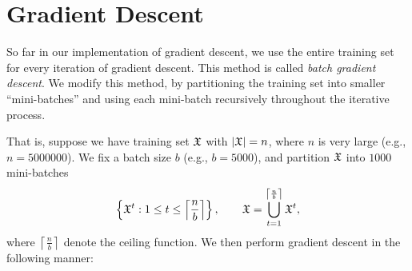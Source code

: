 


\section{Gradient Descent}

So far in our implementation of gradient descent, we use the entire training set for every iteration of gradient descent.  This method is called \textit{batch gradient descent}.  We modify this method, by partitioning the training set into smaller ``mini-batches'' and using each mini-batch recursively throughout the iterative process.  

That is, suppose we have training set $\frak{X}$ with $|\frak{X}|=n$, where $n$ is very large (e.g., $n=5000000$).  We fix a batch size $b$ (e.g., $b=5000$), and partition $\frak{X}$ into $1000$ mini-batches
$$\left\{\frak{X}^t:1\leq t\leq \left\lceil\frac{n}{b}\right\rceil\right\},\qquad\frak{X}=\bigcup_{t=1}^{\left\lceil\frac{n}{b}\right\rceil}\frak{X}^t,$$
where $\left\lceil\frac{n}{b}\right\rceil$ denote the ceiling function.  We then perform gradient descent in the following manner:

